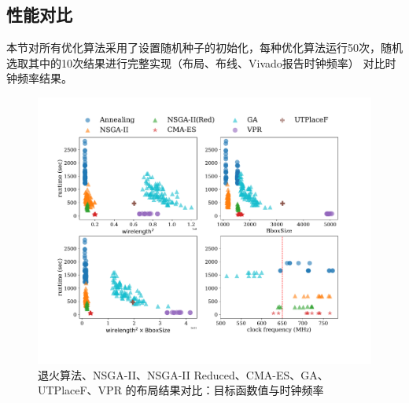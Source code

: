 \subsection{性能对比}

本节对所有优化算法采用了设置随机种子的初始化，每种优化算法运行50次，随机选取其中的10次结果进行完整实现（布局、布线、Vivado报告时钟频率）
对比时钟频率结果。

\begin{figure}[h]
	\centering
	\includegraphics[width=\textwidth]{figure/objective-runtime}
	\caption{退火算法、NSGA-II、NSGA-II Reduced、CMA-ES、GA、UTPlaceF、VPR 的布局结果对比：目标函数值与时钟频率} 
	\label{fig:objective}
\end{figure}


